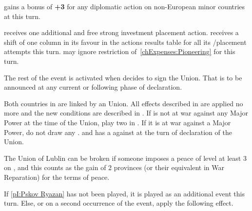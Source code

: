 
\phdipl
\aparag \SPA gains a bonus of {\bf +3} for any diplomatic action on
non-European minor countries at this turn.

\phadm
\aparag \SPA receives one additional and free strong investment \COL placement
action.
\aparag \SPA receives a shift of one column in its favour in the actions
results table for all its \COL/\TP placement attempts this turn.
\aparag \SPA may ignore restriction of~\ref{chExpenses:Pioneering} for this
turn.






\activation{}
\aparag The rest of the event is activated when \POL decides to sign the
Union. That is to be announced at any current or following phase of
declaration.

\phdipl
\aparag Both countries in \POL are linked by an Union. All effects described
in  are applied no more and the new
conditions are described in .
\aparag If \POL is not at war against any Major Power at the time of the
Union, play two \REVOLT in \POL. If it is at war against a Major Power, do not
draw any \REVOLT .
\aparag \RUS and \SUE has a \CB against \POL at the turn of declaration of the
Union.

\effetlong
\aparag The Union of Lublin can be broken if someone imposes a peace of level
at least 3 on \POL, and this counts as the gain of 2 provinces (or their
equivalent in War Reparation) for the terms of peace.






\phevnt
\aparag If \ref{pI:Pskov Ryazan} has not been played, it is played as an
additional event this turn.
\aparag Else, or on a second occurrence of the event, apply the following
effect.

